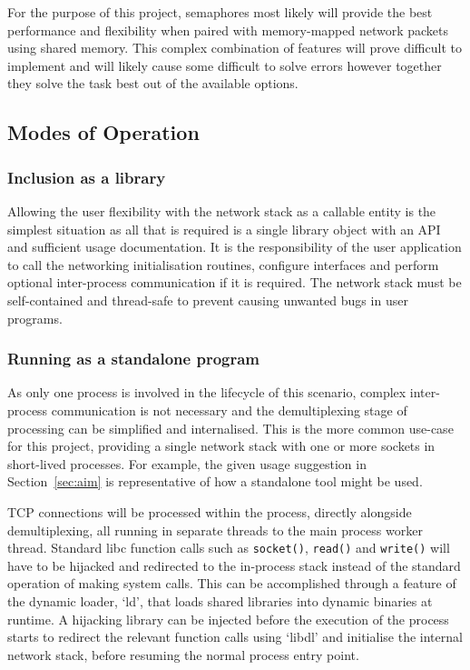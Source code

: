 \documentclass[11pt,a4paper,british]{bhamarticle}
\begin{document}
\begin{multicols}{2}
For the purpose of this project, semaphores most likely will provide the best performance and flexibility when paired with memory-mapped network packets using shared memory. This complex combination of features will prove difficult to implement and will likely cause some difficult to solve errors however together they solve the task best out of the available options.

\subsection{Modes of Operation}
\subsubsection{Inclusion as a library}
Allowing the user flexibility with the network stack as a callable entity is the simplest situation as all that is required is a single library object with an API and sufficient usage documentation. It is the responsibility of the user application to call the networking initialisation routines, configure interfaces and perform optional inter-process communication if it is required. The network stack must be self-contained and thread-safe to prevent causing unwanted bugs in user programs.

\subsubsection{Running as a standalone program}\label{sec:standalone}
As only one process is involved in the lifecycle of this scenario, complex inter-process communication is not necessary and the demultiplexing stage of processing can be simplified and internalised.
This is the more common use-case for this project, providing a single network stack with one or more sockets in short-lived processes. For example, the given usage suggestion in Section~\ref{sec:aim} is representative of how a standalone tool might be used.

TCP connections will be processed within the process, directly alongside demultiplexing, all running in separate threads to the main process worker thread. Standard libc function calls such as \texttt{socket()}, \texttt{read()} and \texttt{write()} will have to be hijacked and redirected to the in-process stack instead of the standard operation of making system calls. This can be accomplished through a feature of the dynamic loader, `ld', that loads shared libraries into dynamic binaries at runtime. A hijacking library can be injected before the execution of the process starts to redirect the relevant function calls using `libdl' and initialise the internal network stack, before resuming the normal process entry point.


\end{multicols}
\end{document}
